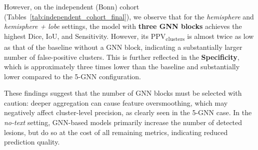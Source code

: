 \documentclass[FCD_GNN.tex]{subfiles}
\begin{document}
However, on the independent (Bonn) cohort (Tables~\ref{tab:independent_cohort_final}), we observe that for the 
\textit{hemisphere} and \textit{hemisphere + lobe} settings, the model with \textbf{three GNN blocks} achieves the 
highest Dice, IoU, and Sensitivity. 
However, its PPV\textsubscript{clusters} is almost twice as low as that of the baseline without a GNN block, 
indicating a substantially larger number of false-positive clusters. 
This is further reflected in the \textbf{Specificity}, which is approximately three times lower than the baseline and substantially lower compared to the 5-GNN configuration.

These findings suggest that the number of GNN blocks must be selected with caution: deeper aggregation can cause 
feature oversmoothing, which may negatively affect cluster-level precision, as clearly seen in the 5-GNN case. 
In the \textit{no-text} setting, GNN-based models primarily increase the number of detected lesions, but do so at 
the cost of all remaining metrics, indicating reduced prediction quality.
\end{document}
